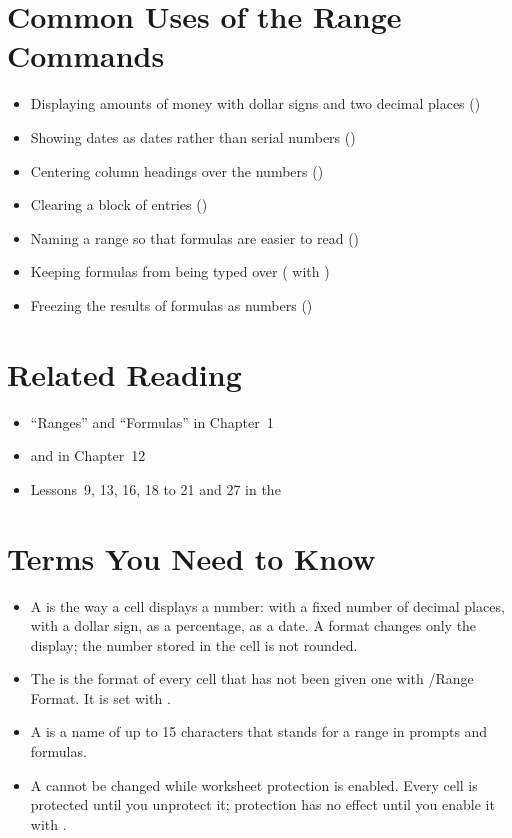 \section{Common Uses of the Range Commands}
\begin{itemize}
\item Displaying amounts of money with dollar signs and two decimal places
  ()
\item Showing dates as dates rather than serial numbers
  ()
\item Centering column headings over the numbers ()
\item Clearing a block of entries ()
\item Naming a range so that formulas are easier to read
  ()
\item Keeping formulas from being typed over (
  with )
\item Freezing the results of formulas as numbers ()
\end{itemize}

\section{Related Reading}
\begin{itemize}
\item ``Ranges'' and ``Formulas'' in Chapter~1
\item {} and  in Chapter~12
\item Lessons~9, 13, 16, 18 to 21 and 27 in the 
\end{itemize}

\section{Terms You Need to Know}
\begin{itemize}
\item A  is the way a cell displays a number: with a fixed
  number of decimal places, with a dollar sign, as a percentage, as a date.
  A format changes only the display; the number stored in the cell is not
  rounded.
\item The  is the format of every cell that has not been
  given one with /Range Format.  It is set with
  .
\item A  is a name of up to 15 characters that stands for
  a range in prompts and formulas.
\item A  cannot be changed while worksheet protection is
  enabled.  Every cell is protected until you unprotect it; protection has
  no effect until you enable it with
  .
\end{itemize}

